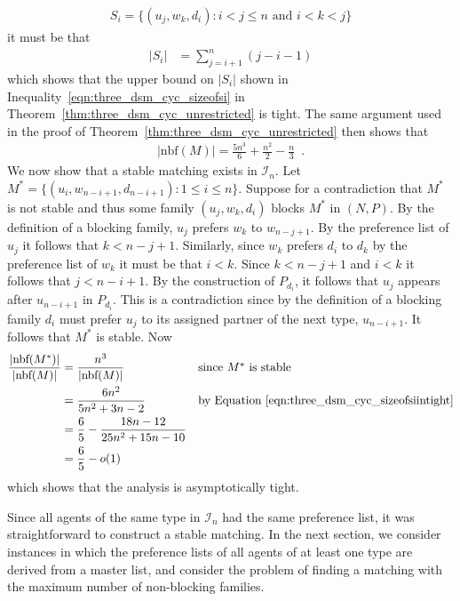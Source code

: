 \begin{align*}
    S_i = \{ ( u_j, w_k, d_i ) : i < j \leq n \text{ and } i < k < j \}
\end{align*}
it must be that
\begin{align*}
    |S_i| &= \sum\limits_{j = i + 1}^{n} (j - i - 1)
\end{align*}
which shows that the upper bound on $|S_i|$ shown in Inequality~\ref{eqn:three_dsm_cyc_sizeofsi} in Theorem~\ref{thm:three_dsm_cyc_unrestricted} is tight. The same argument used in the proof of Theorem~\ref{thm:three_dsm_cyc_unrestricted} then shows that
\begin{align}
    |\textrm{nbf}(M)| = \frac{5n^3}{6} + \frac{n^2}{2} - \frac{n}{3} \label{eqn:three_dsm_cyc_sizeofsiintight}\enspace.
\end{align}
We now show that a stable matching exists in $\mathcal{I}_n$. Let $M^* = \{ ( u_i, w_{n - i + 1}, d_{n - i + 1} ) : 1 \leq i \leq n \}$. Suppose for a contradiction that $M^*$ is not stable and thus some family $( u_j, w_k, d_i )$ blocks $M^*$ in $(N, P)$. By the definition of a blocking family, $u_j$ prefers $w_k$ to $w_{n - j + 1}$. By the preference list of $u_j$ it follows that $k < n - j + 1$. Similarly, since $w_k$ prefers $d_i$ to $d_k$ by the preference list of $w_k$ it must be that $i < k$. Since $k < n - j + 1$ and $i < k$ it follows that $j < n - i + 1$. By the construction of $P_{d_i}$, it follows that $u_j$ appears after $u_{n - i + 1}$ in $P_{d_i}$. This is a contradiction since by the definition of a blocking family $d_i$ must prefer $u_j$ to its assigned partner of the next type, $u_{n - i + 1}$. It follows that $M^*$ is stable. Now
\begin{align*}
    \frac{|\textrm{nbf}(M^*)|}{|\textrm{nbf}(M)|} &= \frac{n^3}{|\textrm{nbf}(M)|} && \mbox{since $M^*$ is stable}\\
    &= \frac{6n^2}{5n^2 + 3n - 2} && \mbox{by Equation~\ref{eqn:three_dsm_cyc_sizeofsiintight}}\\
    &= \frac{6}{5} - \frac{18n - 12}{25n^2 + 15n - 10}\\
    &= \frac{6}{5} - o(1)
\end{align*}
which shows that the analysis is asymptotically tight.

Since all agents of the same type in $\mathcal{I}_n$ had the same preference list, it was straightforward to construct a stable matching. In the next section, we consider instances in which the preference lists of all agents of at least one type are derived from a master list, and consider the problem of finding a matching with the maximum number of non-blocking families.
